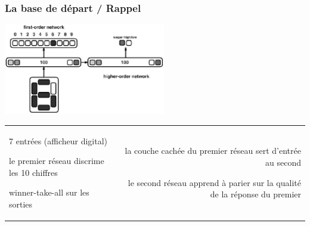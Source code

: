\documentclass[11pt]{beamer}
\newenvironment{noitemize}
{\begin{list}{}{%
\setlength{\labelwidth}{0em}%
\setlength{\labelsep}{2pt}%
\setlength{\leftmargin}{0pt}%
\renewcommand{\makelabel}{\small\color{cloneBlue}{\textbullet}}}}%
{\end{list}}
\newenvironment{minusitemize}
{\begin{list}{}{%
\setlength{\labelwidth}{0em}%
\setlength{\labelsep}{2pt}%
\setlength{\leftmargin}{-20pt}%
\renewcommand{\makelabel}{\small\color{cloneBlue}{\textbullet}}}}%
{\end{list}}
\begin{document}
\begin{frame}\transwipe
  \frametitle{La base de départ / Rappel}
  \begin{center}
  \includegraphics[height=150px]{../cleeremans_2007/digital_reco/schema.png}
  \end{center}

  \begin{center}
  \begin{tabular}{lr}
  \begin{minipage}{150px}
    
    \footnotesize\begin{minusitemize}
     \item 7 entrées (afficheur digital)
     \item le premier réseau discrime les 10 chiffres
     \item winner-take-all sur les sorties
    \end{minusitemize}

    \end{minipage}
    &
    \begin{minipage}{170px}
    \footnotesize\begin{noitemize}
     \item la couche cachée du premier réseau sert d'entrée au second
     \item le second réseau apprend à parier sur la qualité de la réponse du premier
    \end{noitemize}
    
    \end{minipage}
  \end{tabular}

  \end{center}
  
\end{frame}
\end{document}
